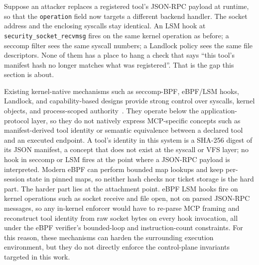 Suppose an attacker replaces a registered tool's JSON-RPC payload at runtime, so that the \texttt{operation} field now targets a different backend handler.
The socket address and the enclosing syscalls stay identical.
An LSM hook at \texttt{security\_\allowbreak socket\_\allowbreak recvmsg} fires on the same kernel operation as before; a seccomp filter sees the same syscall numbers; a Landlock policy sees the same file descriptors.
None of them has a place to hang a check that says ``this tool's manifest hash no longer matches what was registered''.
That is the gap this section is about.

Existing kernel-native mechanisms such as seccomp-BPF, eBPF/LSM hooks, Landlock, and capability-based designs provide strong control over syscalls, kernel objects, and process-scoped authority~\cite{seccomp2026, wright2002lsm, landlock2026, salaun2017landlock, watson2010capsicum, brimhall2023mac, lefeuvre2024sok}.
They operate below the application-protocol layer, so they do not natively express MCP-specific concepts such as manifest-derived tool identity or semantic equivalence between a declared tool and an executed endpoint.
A tool's identity in this system is a SHA-256 digest of its JSON manifest, a concept that does not exist at the syscall or VFS layer; no hook in seccomp or LSM fires at the point where a JSON-RPC payload is interpreted.
Modern eBPF can perform bounded map lookups and keep per-session state in pinned maps, so neither hash checks nor ticket storage is the hard part. 
The harder part lies at the attachment point. 
eBPF LSM hooks fire on kernel operations such as socket receive and file open, not on parsed JSON-RPC messages, so any in-kernel enforcer would have to re-parse MCP framing and reconstruct tool identity from raw socket bytes on every hook invocation, all under the eBPF verifier's bounded-loop and instruction-count constraints.
For this reason, these mechanisms can harden the surrounding execution environment, but they do not directly enforce the control-plane invariants targeted in this work.

